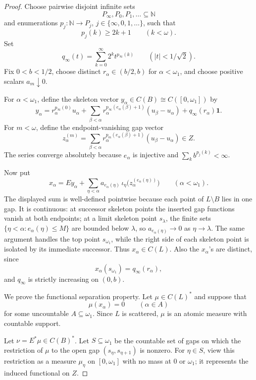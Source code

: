 \documentclass[11pt]{article}
\newcommand{\N}{\mathbb N}
\newcommand{\one}{\mathbf 1}
\begin{document}
\begin{proof}
Choose pairwise disjoint infinite sets
\[
   P_\infty,P_0,P_1,\ldots\subseteq\N
\]
and enumerations \(p_j:\N\to P_j\), \(j\in\{\infty,0,1,\ldots\}\), such that
\[
   p_j(k)\geq 2k+1\qquad(k<\omega).
\]
Set
\[
   q_\infty(t)=\sum_{k=0}^\infty 2^k t^{p_\infty(k)}
   \qquad(|t|<1/\sqrt2).
\]
Fix \(0<b<1/2\), choose distinct \(r_\alpha\in(b/2,b)\) for
\(\alpha<\omega_1\), and choose positive scalars \(a_m\downarrow0\).

For \(\alpha<\omega_1\), define the skeleton vector \(y_\alpha\in C(B)\cong
C([0,\omega_1])\) by
\[
 y_\alpha
   = r_\alpha^{p_\infty(0)}u_\alpha
     +\sum_{\beta<\alpha}
        r_\alpha^{p_\infty(e_\alpha(\beta)+1)}(u_\beta-u_\alpha)
     +q_\infty(r_\alpha)\one .
\]
For \(m<\omega\), define the endpoint-vanishing gap vector
\[
 z_\alpha^{(m)}
   =\sum_{\beta<\alpha}
        r_\alpha^{p_m(e_\alpha(\beta)+1)}(u_\beta-u_\alpha)
     \in Z.
\]
The series converge absolutely because \(e_\alpha\) is injective and
\(\sum_k b^{p_j(k)}<\infty\).

Now put
\[
   x_\alpha
   =E y_\alpha+
     \sum_{\eta<\alpha}
       a_{e_\alpha(\eta)}\,\iota_\eta\bigl(z_\alpha^{(e_\alpha(\eta))}\bigr)
       \qquad(\alpha<\omega_1).
\]
The displayed sum is well-defined pointwise because each point of
\(L\setminus B\) lies in one gap.  It is continuous: at successor skeleton
points the inserted gap functions vanish at both endpoints; at a limit
skeleton point \(s_\lambda\), the finite sets
\(\{\eta<\alpha:e_\alpha(\eta)\leq M\}\) are bounded below \(\lambda\), so
\(a_{e_\alpha(\eta)}\to0\) as \(\eta\to\lambda\).  The same argument handles
the top point \(s_{\omega_1}\), while the right side of each skeleton point is
isolated by its immediate successor.  Thus \(x_\alpha\in C(L)\).  Also the
\(x_\alpha\)'s are distinct, since
\[
   x_\alpha(s_{\omega_1})=q_\infty(r_\alpha),
\]
and \(q_\infty\) is strictly increasing on \((0,b)\).

We prove the functional separation property.  Let \(\mu\in C(L)^*\) and
suppose that
\[
   \mu(x_\alpha)=0\qquad(\alpha\in A)
\]
for some uncountable \(A\subseteq\omega_1\).  Since \(L\) is scattered, \(\mu\)
is an atomic measure with countable support.

Let \(\nu=E^*\mu\in C(B)^*\).  Let \(S\subseteq\omega_1\) be the countable set
of gaps on which the restriction of \(\mu\) to the open gap
\((s_\eta,s_{\eta+1})\) is nonzero.  For \(\eta\in S\), view this restriction
as a measure \(\mu_\eta\) on \([0,\omega_1]\) with no mass at \(0\) or
\(\omega_1\); it represents the induced functional on \(Z\).


\end{proof}
\end{document}
